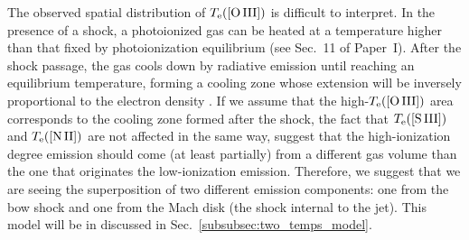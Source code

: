 \documentclass[twocolumn]{aastex63}
\begin{document}
The observed spatial distribution of $T_{\rm e}(\text{[O\thinspace III]})$ is difficult to interpret. In the presence of a shock, a photoionized gas can be heated at a temperature higher than that fixed by  photoionization equilibrium \citep{zeldovich67} (see Sec.~11 of Paper~I). After the shock passage, the gas cools down by radiative emission until reaching an equilibrium temperature, forming a cooling zone whose extension will be inversely proportional to the electron density \citep[][]{Hartigan87}. If we assume that the high-$T_{\rm e}(\text{[O\thinspace III]})$ area corresponds to the cooling zone formed after the shock, the fact that $T_{\rm e}(\text{[S\thinspace III]})$ and $T_{\rm e}(\text{[N\thinspace II]})$ are not affected in the same way, suggest that the high-ionization degree emission should come (at least partially) from a different gas volume than the one that originates the low-ionization  emission. Therefore, we suggest that we are seeing the superposition of two different emission components: one from the bow shock and one from the Mach disk (the shock internal to the jet). This model will be in discussed in Sec.~\ref{subsubsec:two_temps_model}.

\end{document}
